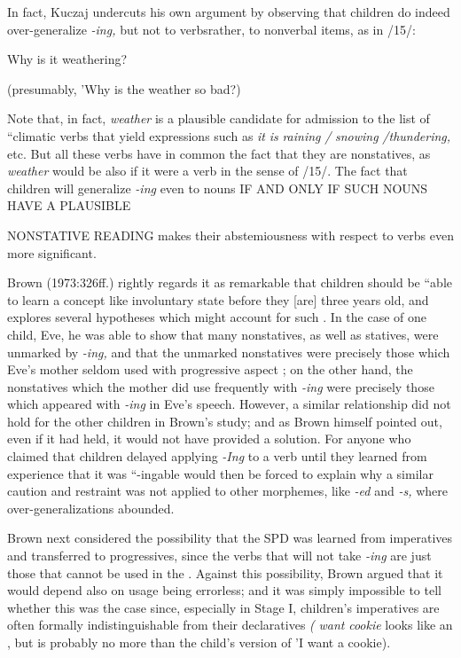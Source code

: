 In fact, Kuczaj undercuts his own argument by observing that children do indeed over-generalize \textit{{}-ing,} but not to  verbs\-rather, to nonverbal items, as in /15/:

\ea\label{ex:15}
 Why is it weathering?
\glt
\z

(presumably, 'Why is the weather so bad?)


Note that, in fact, \textit{weather }is a plausible candidate for admission to the list of ``climatic verbs that yield expressions such as \textit{it} \textit{is} \textit{raining} \textit{/} \textit{snowing} \textit{/thundering, }etc. But all these verbs have in common the fact that they are nonstatives, as \textit{weather }would be also if it were a verb in the sense of /15/. The fact that children will generalize \textit{{}-ing} even to nouns IF AND ONLY IF SUCH NOUNS HAVE A PLAUSIBLE

NONSTATIVE READING makes their abstemiousness with respect to  verbs even more significant.

Brown (1973:326ff.) rightly regards it as remarkable that chil\-dren should be ``able to learn a concept like involuntary state before they [are] three years old, and explores several hypotheses which might account for such . In the case of one child, Eve, he was able to show that many nonstatives, as well as statives, were unmarked by \textit{{}-ing,} and that the unmarked nonstatives were precisely those which Eve's mother seldom used with progressive aspect ; on the other hand, the nonstatives which the mother did use frequently with \textit{{}-ing} were precisely those which appeared with \textit{{}-ing }in Eve's speech. However, a similar relationship did not hold for the other children in Brown's study; and as Brown himself pointed out, even if it had held, it would not have provided a solution. For anyone who claimed that children delayed applying \textit{{}-I}\textit{n}\textit{g} to a verb until they learned from experience that it was ``{}-ingable would then be forced to explain why a similar caution and restraint was not applied to other morphemes, like \textit{{}-ed }and \textit{{}-s,} where over-generalizations abounded.

Brown next considered the possibility that the SPD was learned from imperatives and transferred to progressives, since the verbs that will not take \textit{{}-ing} are just those that cannot be used in the . Against this possibility, Brown argued that it would depend also on  usage being errorless; and it was simply impossible to tell whether this was the case since, especially in Stage I, children's impera\-tives are often formally indistinguishable from their declaratives \textit{(} \textit{want} \textit{cookie} looks like an , but is probably no more than the child's version of 'I want a cookie).

